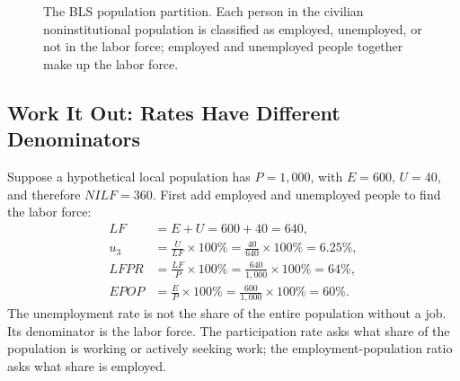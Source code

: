 \documentclass[11pt,letterpaper]{article}
\begin{document}
\begin{figure}[htbp]
\centering
{}
\caption{The BLS population partition. Each person in the civilian noninstitutional population is classified as employed, unemployed, or not in the labor force; employed and unemployed people together make up the labor force.}
\label{fig:bls-population-map}
\end{figure}

\subsection{Work It Out: Rates Have Different Denominators}
Suppose a hypothetical local population has $P=1{,}000$, with $E=600$, $U=40$, and therefore $NILF=360$. First add employed and unemployed people to find the labor force:
\begin{align}
LF &= E+U = 600+40=640,\\
u_3 &= \frac{U}{LF}\times 100\% = \frac{40}{640}\times100\%=6.25\%,\\
LFPR &= \frac{LF}{P}\times100\% = \frac{640}{1{,}000}\times100\%=64\%,\\
EPOP &= \frac{E}{P}\times100\% = \frac{600}{1{,}000}\times100\%=60\%.
\end{align}
The unemployment rate is not the share of the entire population without a job. Its denominator is the labor force. The participation rate asks what share of the population is working or actively seeking work; the employment-population ratio asks what share is employed.
\end{document}
